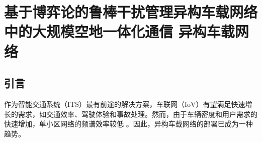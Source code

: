 \chapter{基于博弈论的鲁棒干扰管理异构车载网络中的大规模空地一体化通信
异构车载网络}

\section{引言}\label{section2-1}
作为智能交通系统（ITS）最有前途的解决方案，车联网（IoV）有望满足快速增长的需求，如交通效率、驾驶体验和事故处理。然而，由于车辆密度和用户需求的快速增加，单小区网络的频谱效率较低
\cite{TFL}。因此，异构车载网络的部署已成为一种趋势。

